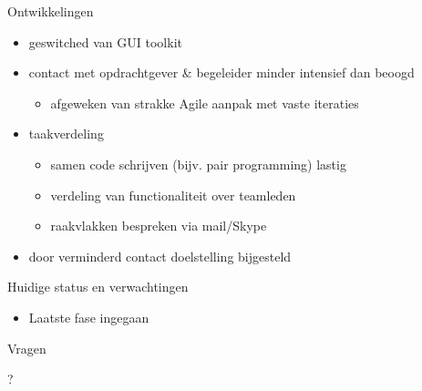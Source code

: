 \documentclass[10pt]{beamer}
\begin{document}
\begin{frame}{Ontwikkelingen}
 
    \begin{itemize}
        \item geswitched van GUI toolkit
        \item contact met opdrachtgever \& begeleider minder intensief dan beoogd
        \begin{itemize}
         \item afgeweken van strakke Agile aanpak met vaste iteraties
        \end{itemize}
        \item taakverdeling
        \begin{itemize}
         \item samen code schrijven (bijv. pair programming) lastig
         \item verdeling van functionaliteit over teamleden
         \item raakvlakken bespreken via mail/Skype
        \end{itemize}
        \item door verminderd contact doelstelling bijgesteld

    \end{itemize}

\end{frame}


\begin{frame}{Huidige status en verwachtingen}

    \begin{itemize}
        \item Laatste fase ingegaan
    \end{itemize}

\end{frame}


\begin{frame}{Vragen}

\centering
?

\end{frame}
\end{document}
